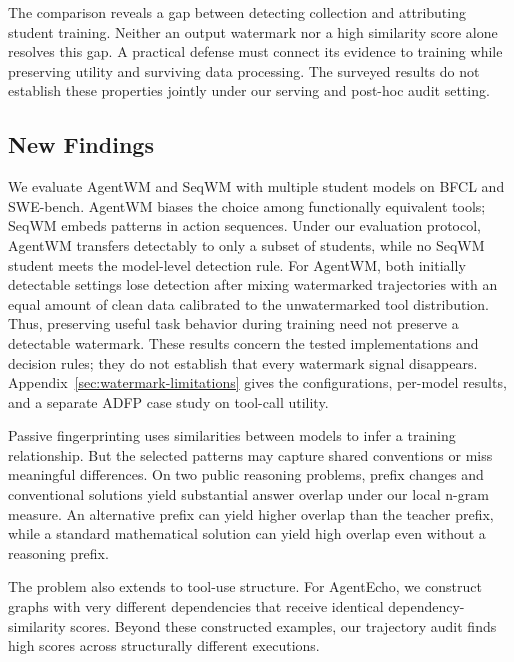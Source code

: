 The comparison reveals a gap between detecting collection and attributing
student training. Neither an output watermark nor a high similarity score
alone resolves this gap. A practical defense must connect its evidence to
training while preserving utility and surviving data processing.
The surveyed results do not establish these properties jointly under our
serving and post-hoc audit setting.

\subsection{New Findings}
\label{sec:systematization-findings}

We evaluate AgentWM and SeqWM with multiple student models on BFCL and
SWE-bench. AgentWM biases the choice among functionally equivalent tools;
SeqWM embeds patterns in action sequences.
Under our evaluation protocol, AgentWM transfers detectably to only a subset
of students, while no SeqWM student meets the model-level detection rule.
For AgentWM, both initially detectable settings lose detection after mixing
watermarked trajectories with an equal amount of clean data calibrated to
the unwatermarked tool distribution.
Thus, preserving useful task behavior during training need not preserve a
detectable watermark. These results concern the tested implementations and
decision rules; they do not establish that every watermark signal disappears.
Appendix~\ref{sec:watermark-limitations} gives the configurations, per-model
results, and a separate ADFP case study on tool-call utility.

Passive fingerprinting uses similarities between models to infer a training
relationship. But the selected patterns may capture shared conventions or
miss meaningful differences. On two public reasoning problems, prefix changes
and conventional solutions yield substantial answer overlap under our local
n-gram measure. An alternative prefix can yield higher overlap than the
teacher prefix, while a standard mathematical solution can yield high overlap
even without a reasoning prefix.

The problem also extends to tool-use structure. For AgentEcho, we construct
graphs with very different dependencies that receive identical
dependency-similarity scores. Beyond these constructed examples, our
trajectory audit finds high scores across structurally different executions.

